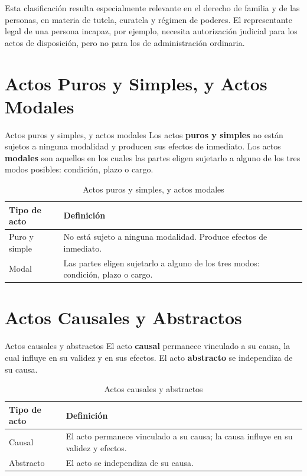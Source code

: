 \documentclass[12pt,oneside]{book}
\begin{document}
\begin{note}
Esta clasificación resulta especialmente relevante en el derecho de familia y de las personas, en materia de tutela, curatela y régimen de poderes. El representante legal de una persona incapaz, por ejemplo, necesita autorización judicial para los actos de disposición, pero no para los de administración ordinaria.
\end{note}

\section{Actos Puros y Simples, y Actos Modales}

\begin{definition}{Actos puros y simples, y actos modales}
Los actos \textbf{puros y simples} no están sujetos a ninguna modalidad y producen sus efectos de inmediato. Los actos \textbf{modales} son aquellos en los cuales las partes eligen sujetarlo a alguno de los tres modos posibles: condición, plazo o cargo.
\end{definition}

\begin{table}[H]
\centering
\begin{tabularx}{\textwidth}{l X}
\toprule
\textbf{Tipo de acto} & \textbf{Definición} \\
\midrule
Puro y simple & No está sujeto a ninguna modalidad. Produce efectos de inmediato. \\
Modal & Las partes eligen sujetarlo a alguno de los tres modos: condición, plazo o cargo. \\
\bottomrule
\end{tabularx}
\caption{Actos puros y simples, y actos modales}
\end{table}

\section{Actos Causales y Abstractos}

\begin{definition}{Actos causales y abstractos}
El acto \textbf{causal} permanece vinculado a su causa, la cual influye en su validez y en sus efectos. El acto \textbf{abstracto} se independiza de su causa.
\end{definition}

\begin{table}[H]
\centering
\begin{tabularx}{\textwidth}{l X}
\toprule
\textbf{Tipo de acto} & \textbf{Definición} \\
\midrule
Causal & El acto permanece vinculado a su causa; la causa influye en su validez y efectos. \\
Abstracto & El acto se independiza de su causa. \\
\bottomrule
\end{tabularx}
\caption{Actos causales y abstractos}
\end{table}
\end{document}
